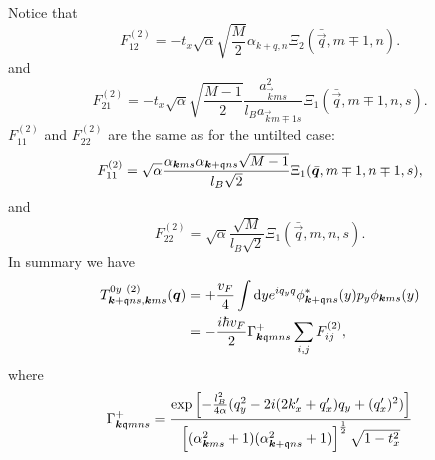 Notice that
\begin{equation}
  F^{(2)}_{12}
  = -t_x \sqrt{\alpha}  \sqrt{\frac{M}{2}} \alpha _{k+q, n} \Xi_2(\bar{\vec{q}}, m\mp 1, n).
\end{equation}
and
\begin{equation}
  \label{eq:84}
  F^{(2)}_{21}
  =
  -t_{x} \sqrt{\alpha} \sqrt{\frac{M-1}{2}} \frac{a_{\vec{k} m s}^2}{l_B a_{\vec{k} m \mp 1 s}}
  \Xi_{1} (\bar{\vec{q}}, m \mp 1, n, s).
\end{equation}
\( F^{(2)}_{11} \) and \( F^{(2)}_{22} \) are the same as for the untilted case:
\begin{equation}
  \label{eq:85}
  F^{(2)}_{11} = \sqrt{\alpha}  \frac{\alpha_{\bm{k} m s} \alpha_{\bm{k} + \mathfrak{q} ns} \sqrt{M-1} }{ l_B \sqrt{2} }
  \Xi_{1} (\bar{\bm{q}}, m\mp 1, n\mp 1, s),
\end{equation}
and
\begin{equation}
  \label{eq:86}
  F^{(2)}_{22} =
  \sqrt{\alpha }
  \frac{\sqrt{M} }{l_B \sqrt{2} }
  \Xi_{1} ( \bar{\vec{q}}, m, n, s ).
\end{equation}
In summary we have
\begin{align}
  \label{eq:87}
  T^{0y~(2)}_{\bm{k} + \mathfrak{q} ns, \bm{k} ms} (\bm{q}) &= + \frac{v_F}{4} \int \mathrm{d} y
  e^{i q_y q} \phi _{\bm{k} + \mathfrak{q} ns}^{*} (y) p_{y} \phi _{\bm{k} ms} (y)\\
&= -\frac{ i \hbar v_{F} }{2}
                                                                                     \Gamma _{\bm{k} \mathfrak{q} m n s}^+
\sum\limits_{i,j}^{} F^{(2)}_{ij},
\end{align}
where
\[
  \Gamma _{\bm{k} \mathfrak{q} m n s}^+ =
  \frac{
  \exp
  \left[
    - \frac{l_{B}^2}{4 \alpha } (q_{y}^2 - 2 i (2k' _x + q' _x) q_{y} + (q' _x)^2 )
  \right  ]
}{
  \left[(\alpha_{\bm{k} m s}^2 +1) (\alpha_{\bm{k} + \mathfrak{q} ns} ^2 + 1)\right]^{\frac{1}{2}}
  \sqrt{1 - t_x^2 }}
\]

